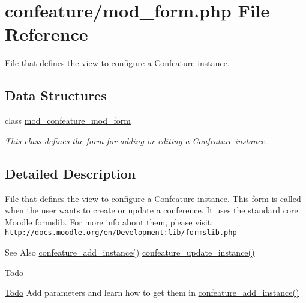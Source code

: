 \hypertarget{mod__form_8php}{\section{confeature/mod\-\_\-form.php File Reference}
\label{mod__form_8php}
}


File that defines the view to configure a Confeature instance.  


\subsection*{Data Structures}
\begin{DoxyCompactItemize}
\item 
class \hyperlink{classmod__confeature__mod__form}{mod\-\_\-confeature\-\_\-mod\-\_\-form}
\begin{DoxyCompactList}\small\item\em This class defines the form for adding or editing a Confeature instance. \end{DoxyCompactList}\end{DoxyCompactItemize}


\subsection{Detailed Description}
File that defines the view to configure a Confeature instance. This form is called when the user wants to create or update a conference. It uses the standard core Moodle formslib. For more info about them, please visit\-: \href{http://docs.moodle.org/en/Development:lib/formslib.php}{\tt http\-://docs.\-moodle.\-org/en/\-Development\-:lib/formslib.\-php} \begin{DoxySeeAlso}{See Also}
\hyperlink{lib_8php_a7e22c75c28ab3ae8b48c1d332f648fc5}{confeature\-\_\-add\-\_\-instance()} \hyperlink{lib_8php_a55bc12394a95bb1e3e069ce5a6e79c8f}{confeature\-\_\-update\-\_\-instance()} 
\end{DoxySeeAlso}
\begin{DoxyRefDesc}{Todo}
\item[\hyperlink{todo__todo000006}{Todo}]Add parameters and learn how to get them in \hyperlink{lib_8php_a7e22c75c28ab3ae8b48c1d332f648fc5}{confeature\-\_\-add\-\_\-instance()} \end{DoxyRefDesc}
